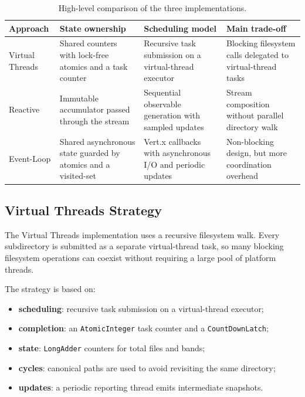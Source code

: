 \begin{table}[h]
\centering
\renewcommand{\arraystretch}{1.2}
\begin{tabular}{>{\raggedright\arraybackslash}p{2.7cm} >{\raggedright\arraybackslash}p{3.8cm} >{\raggedright\arraybackslash}p{3.8cm} >{\raggedright\arraybackslash}p{3.8cm}}
\toprule
\textbf{Approach} & \textbf{State ownership} & \textbf{Scheduling model} & \textbf{Main trade-off} \\
\midrule
Virtual Threads & Shared counters with lock-free atomics and a task counter & Recursive task submission on a virtual-thread executor & Blocking filesystem calls delegated to virtual-thread tasks \\
Reactive & Immutable accumulator passed through the stream & Sequential observable generation with sampled updates & Stream composition without parallel directory walk \\
Event-Loop & Shared asynchronous state guarded by atomics and a visited-set & Vert.x callbacks with asynchronous I/O and periodic updates & Non-blocking design, but more coordination overhead \\
\bottomrule
\end{tabular}
\caption{High-level comparison of the three implementations.}
\end{table}

\subsection{Virtual Threads Strategy}

The Virtual Threads implementation uses a recursive filesystem walk.
Every subdirectory is submitted as a separate virtual-thread task, so many blocking filesystem operations can coexist without requiring a large pool of platform threads.

The strategy is based on:

\begin{itemize}
  \item \textbf{scheduling}: recursive task submission on a virtual-thread executor;
  \item \textbf{completion}: an \texttt{AtomicInteger} task counter and a \texttt{CountDownLatch};
  \item \textbf{state}: \texttt{LongAdder} counters for total files and bands;
  \item \textbf{cycles}: canonical paths are used to avoid revisiting the same directory;
  \item \textbf{updates}: a periodic reporting thread emits intermediate snapshots.
\end{itemize}

